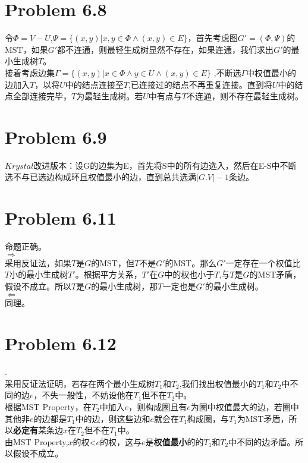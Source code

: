 \documentclass[twocolumn]{ctexart}
\begin{document}
\section*{Problem 6.8}
\indent 令$\varPhi=V-U$,$\varPsi=\{(x,y)|x,y\in\varPhi \wedge (x,y)\in E\}$，首先考虑图$G'=(\varPhi,\varPsi)$的MST，如果$G'$都不连通，则最轻生成树显然不存在，如果连通，我们求出$G'$的最小生成树$T$。\\
\indent 接着考虑边集$\Gamma=\{(x,y)|x\in\varPhi \wedge y\in U \wedge (x,y)\in E \}$
,不断选$\Gamma$中权值最小的边加入$T$，以将$U$中的结点连接至$T$,已连接过的结点不再重复连接。直到将$U$中的结点全部连接完毕，$T$为最轻生成树。若$U$中有点与$T$不连通，则不存在最轻生成树。

\section*{Problem 6.9}
\indent $Krystal$改进版本：设G的边集为E，首先将S中的所有边选入，然后在E-S中不断选不与已选边构成环且权值最小的边，直到总共选满$|G.V|-1$条边。

\section*{Problem 6.11}
\noindent 命题正确。\\
\indent $\Rightarrow$\\
\indent 采用反证法，如果$T$是$G$的MST，但$T$不是$G'$的MST。那么$G'$一定存在一个权值比$T$小的最小生成树$T'$。根据平方关系，$T'$在$G$中的权也小于$T$,与$T$是$G$的MST矛盾，假设不成立。所以$T$是$G$的最小生成树，那$T$一定也是$G'$的最小生成树。\\

\indent $\Leftarrow$\\
\indent 同理。

\section*{Problem 6.12}
.\\
\indent 采用反证法证明，若存在两个最小生成树$T_1$和$T_2$,我们找出权值最小的$T_1$和$T_2$中不同的边$e$，不失一般性，不妨设他在$T_1$但不在$T_2$中。\\
\indent
根据MST Property，在$T_2$中加入$e$，则构成圈且有$e$为圈中权值最大的边，若圈中其他非$e$的边都是$T_1$中的边，则这些边和$e$就会在$T_1$构成圈，与$T_1$为MST矛盾，所以\textbf{必定有}某条边$x$在$T_2$但不在$T_1$中。\\
\indent 由MST Property,$x$的权<$e$的权，这与$e$是\textbf{权值最小}的的$T_1$和$T_2$中不同的边矛盾。所以假设不成立。\\
\end{document}
